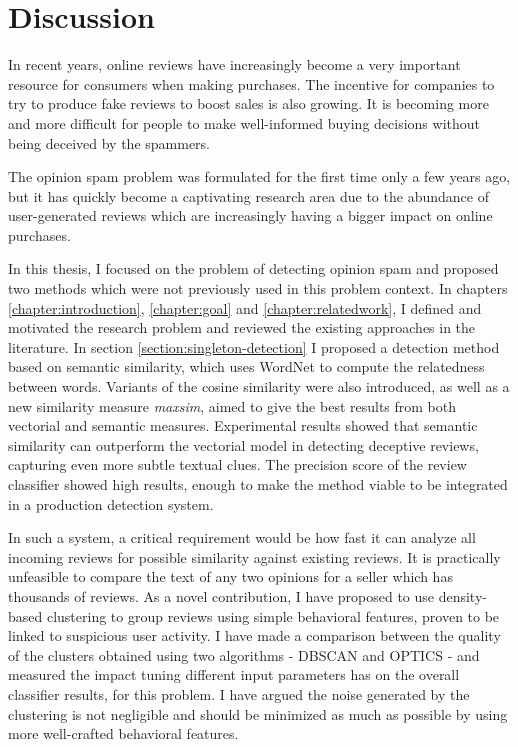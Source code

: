 \chapter{Discussion}\label{chapter:discussion}

In recent years, online reviews have increasingly become a very important resource for consumers when making purchases. The incentive for companies to try to produce fake reviews to boost sales is also growing. It is becoming more and more difficult for people to make well-informed buying decisions without being deceived by the spammers. 

The opinion spam problem was formulated for the first time only a few years ago, but it has quickly become a captivating research area due to the abundance of user-generated reviews which are increasingly having a bigger impact on online purchases. 

In this thesis, I focused on the problem of detecting opinion spam and proposed two methods which were not previously used in this problem context. In chapters \ref{chapter:introduction}, \ref{chapter:goal} and \ref{chapter:relatedwork}, I defined and motivated the research problem and reviewed the existing approaches in the literature. In section \ref{section:singleton-detection} I proposed a detection method based on semantic similarity, which uses WordNet to compute the relatedness between words. Variants of the cosine similarity were also introduced, as well as a new similarity measure \textit{maxsim}, aimed to give the best results from both vectorial and semantic measures. Experimental results showed that semantic similarity can outperform the vectorial model in detecting deceptive reviews, capturing even more subtle textual clues. The precision score of the review classifier showed high results, enough to make the method viable to be integrated in a production detection system.

In such a system, a critical requirement would be how fast it can analyze all incoming reviews for possible similarity against existing reviews. It is practically unfeasible to compare the text of any two opinions for a seller which has thousands of reviews. As a novel contribution, I have proposed to use density-based clustering to group reviews using simple behavioral features, proven to be linked to suspicious user activity. I have made a comparison between the quality of the clusters obtained using two algorithms - DBSCAN and OPTICS - and measured the impact tuning different input parameters has on the overall classifier results, for this problem. I have argued the noise generated by the clustering is not negligible and should be minimized as much as possible by using more well-crafted behavioral features.

